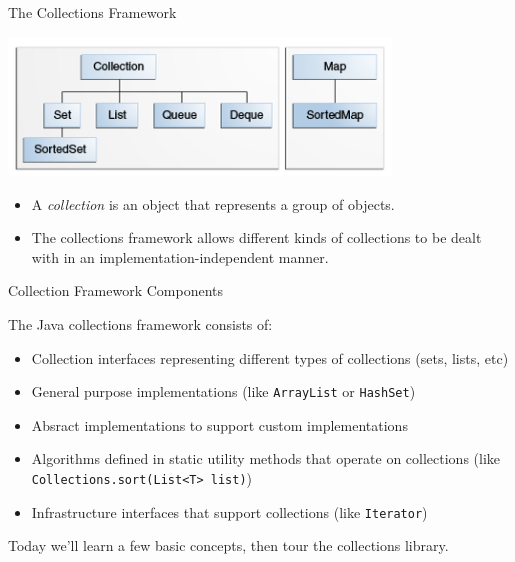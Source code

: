 \documentclass{beamer}
\author[Chris Simpkins] 
{Christopher Simpkins \\\texttt{chris.simpkins@gatech.edu}}
\institute[Georgia Tech] %
\date[CS 1331]{}
\begin{document}
\begin{frame}
  \titlepage
\end{frame}


\begin{frame}[fragile]{The Collections Framework}

\begin{center}
\includegraphics[width=4in]{colls-coreInterfaces.png}
\end{center}

\begin{itemize}
\item A {\it collection} is an object that represents a group of objects.
\item The collections framework allows different kinds of collections to be dealt with in an implementation-independent manner.
\end{itemize}


\end{frame}

\begin{frame}[fragile]{Collection Framework Components}

The Java collections framework consists of:
\begin{itemize}
\item Collection interfaces representing different types of collections (sets, lists, etc)
\item General purpose implementations (like {\tt ArrayList} or {\tt HashSet})
\item Absract implementations to support custom implementations
\item Algorithms defined in static utility methods that operate on collections (like {\tt Collections.sort(List<T> list)})
\item Infrastructure interfaces that support collections (like {\tt Iterator})
\end{itemize}
Today we'll learn a few basic concepts, then tour the collections library.
\end{frame}
\end{document}
